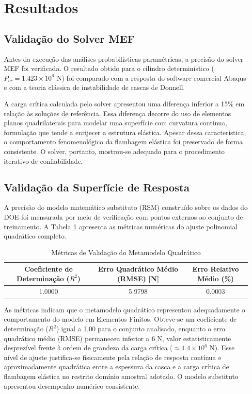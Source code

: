 \documentclass[12pt,a4paper]{article}
\begin{document}
\section{Resultados}

\subsection{Validação do Solver MEF}
Antes da execução das análises probabilísticas paramétricas, a precisão do solver MEF foi verificada. O resultado obtido para o cilindro determinístico ($P_{cr} = 1.423 \times 10^6$ N) foi comparado com a resposta do software comercial Abaqus e com a teoria clássica de instabilidade de cascas de Donnell. 

A carga crítica calculada pelo solver apresentou uma diferença inferior a 15\% em relação às soluções de referência. Essa diferença decorre do uso de elementos planos quadrilaterais para modelar uma superfície com curvatura contínua, formulação que tende a enrijecer a estrutura elástica. Apesar dessa característica, o comportamento fenomenológico da flambagem elástica foi preservado de forma consistente. O solver, portanto, mostrou-se adequado para o procedimento iterativo de confiabilidade.

\subsection{Validação da Superfície de Resposta}
A precisão do modelo matemático substituto (RSM) construído sobre os dados do DOE foi mensurada por meio de verificação com pontos externos ao conjunto de treinamento. A Tabela \ref{tab:rsm} apresenta as métricas numéricas do ajuste polinomial quadrático completo.

\begin{table}[ht]
\centering
\caption{Métricas de Validação do Metamodelo Quadrático}
\label{tab:rsm}
\begin{tabular}{ccc}
\hline
Coeficiente de Determinação ($R^2$) & Erro Quadrático Médio (RMSE) [N] & Erro Relativo Médio (\%) \\
\hline
1.0000 & 5.9798 & 0.0003 \\
\hline
\end{tabular}
\end{table}

As métricas indicam que o metamodelo quadrático representou adequadamente o comportamento do modelo em Elementos Finitos. Obteve-se um coeficiente de determinação ($R^2$) igual a 1,00 para o conjunto analisado, enquanto o erro quadrático médio (RMSE) permaneceu inferior a $6$ N, valor estatisticamente desprezível frente à ordem de grandeza da carga crítica ($\approx 1.4 \times 10^6$ N). Esse nível de ajuste justifica-se fisicamente pela relação de resposta contínua e aproximadamente quadrática entre a espessura da casca e a carga crítica de flambagem elástica no restrito domínio amostral adotado. O modelo substituto apresentou desempenho numérico consistente.
\end{document}
